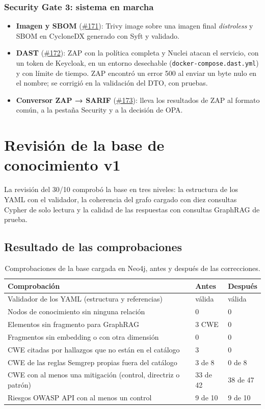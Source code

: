 \documentclass[11pt,a4paper]{report}
\newcommand{\pr}[1]{\href{https://github.com/PracticasESPE/Framework_Desarrollo_Seguro/pull/#1}{\##1}}
\begin{document}
\subsection{Security Gate 3: sistema en marcha}
\begin{itemize}
\item \textbf{Imagen y SBOM} (\pr{171}): Trivy image sobre una imagen final \emph{distroless} y
SBOM en CycloneDX generado con Syft y validado.
\item \textbf{DAST} (\pr{172}): ZAP con la política completa y Nuclei atacan el servicio, con un
token de Keycloak, en un entorno desechable (\texttt{docker-compose.dast.yml}) y con límite de
tiempo. ZAP encontró un error 500 al enviar un byte nulo en el nombre; se corrigió en la
validación del DTO, con pruebas.
\item \textbf{Conversor ZAP → SARIF} (\pr{173}): lleva los resultados de ZAP al formato común, a la
pestaña Security y a la decisión de OPA.
\end{itemize}

\chapter{Revisión de la base de conocimiento v1}

La revisión del 30/10 comprobó la base en tres niveles: la estructura de los YAML con el
validador, la coherencia del grafo cargado con diez consultas Cypher de solo lectura y la calidad
de las respuestas con consultas GraphRAG de prueba.

\section{Resultado de las comprobaciones}

\begin{table}[H]
\centering
\caption{Comprobaciones de la base cargada en Neo4j, antes y después de las correcciones.}
\begin{tabularx}{\textwidth}{@{}LP{2.6cm}P{2.6cm}@{}}
\toprule
\textbf{Comprobación} & \textbf{Antes} & \textbf{Después}\\
\midrule
Validador de los YAML (estructura y referencias) & válida & válida\\
Nodos de conocimiento sin ninguna relación & 0 & 0\\
Elementos sin fragmento para GraphRAG & 3 CWE & 0\\
Fragmentos sin embedding o con otra dimensión & 0 & 0\\
CWE citadas por hallazgos que no están en el catálogo & 3 & 0\\
CWE de las reglas Semgrep propias fuera del catálogo & 3 de 8 & 0 de 8\\
CWE con al menos una mitigación (control, directriz o patrón) & 33 de 42 & 38 de 47\\
Riesgos OWASP API con al menos un control & 9 de 10 & 9 de 10\\
\bottomrule
\end{tabularx}
\end{table}
\end{document}
